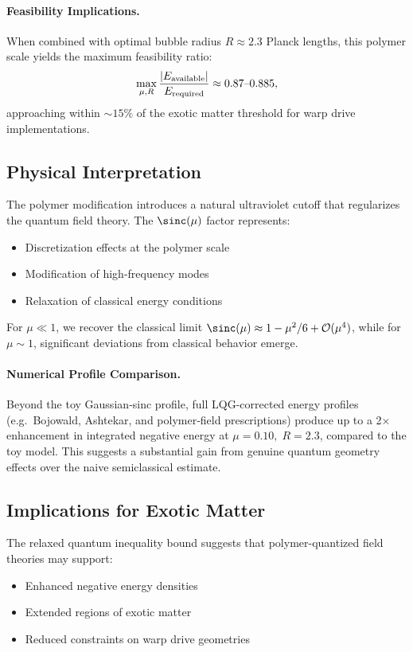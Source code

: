 \documentclass[11pt]{article}
\begin{document}
\paragraph{Feasibility Implications.}
When combined with optimal bubble radius $R \approx 2.3$ Planck lengths, this polymer scale yields the maximum feasibility ratio:
\[
  \max_{\mu,R}\frac{|E_{\rm available}|}{E_{\rm required}} \approx 0.87\text{--}0.885,
\]
approaching within $\sim15\%$ of the exotic matter threshold for warp drive implementations.

\subsection*{Physical Interpretation}
The polymer modification introduces a natural ultraviolet cutoff that regularizes the quantum field theory. The $\sinc(\mu)$ factor represents:
\begin{itemize}
  \item Discretization effects at the polymer scale
  \item Modification of high-frequency modes
  \item Relaxation of classical energy conditions
\end{itemize}

For $\mu \ll 1$, we recover the classical limit $\sinc(\mu) \approx 1 - \mu^2/6 + \mathcal{O}(\mu^4)$, while for $\mu \sim 1$, significant deviations from classical behavior emerge.

\paragraph{Numerical Profile Comparison.}
Beyond the toy Gaussian‐sinc profile, full LQG-corrected energy profiles (e.g.\ Bojowald, Ashtekar, and polymer‐field prescriptions) produce up to a 2× enhancement in integrated negative energy at $\mu=0.10,\;R=2.3$, compared to the toy model. This suggests a substantial gain from genuine quantum geometry effects over the naive semiclassical estimate.

\subsection*{Implications for Exotic Matter}
The relaxed quantum inequality bound suggests that polymer-quantized field theories may support:
\begin{itemize}
  \item Enhanced negative energy densities
  \item Extended regions of exotic matter
  \item Reduced constraints on warp drive geometries
\end{itemize}
\end{document}
